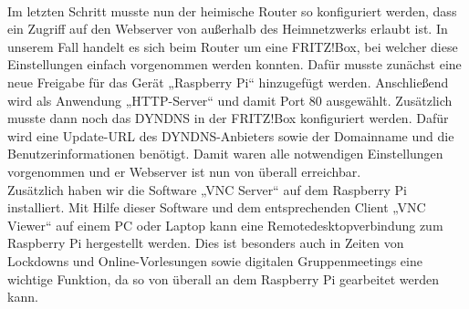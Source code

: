 \\
Im letzten Schritt musste nun der heimische Router so konfiguriert werden, dass ein Zugriff auf den Webserver von außerhalb des Heimnetzwerks erlaubt ist. In unserem Fall handelt es sich beim Router um eine FRITZ!Box, bei welcher diese Einstellungen einfach vorgenommen werden konnten.  Dafür musste zunächst eine neue Freigabe für das Gerät „Raspberry Pi“ hinzugefügt werden. Anschließend wird als Anwendung „HTTP-Server“ und damit Port 80 ausgewählt. Zusätzlich musste dann noch das DYNDNS in der FRITZ!Box konfiguriert werden. Dafür wird eine Update-URL des DYNDNS-Anbieters sowie der Domainname und die Benutzerinformationen benötigt. Damit waren alle notwendigen Einstellungen vorgenommen und er Webserver ist nun von überall erreichbar.
\\
Zusätzlich haben wir die Software „VNC Server“ auf dem Raspberry Pi installiert. Mit Hilfe dieser Software und dem entsprechenden Client „VNC Viewer“ auf einem PC oder Laptop kann eine Remotedesktopverbindung zum Raspberry Pi hergestellt werden. Dies ist besonders auch in Zeiten von Lockdowns und Online-Vorlesungen sowie digitalen Gruppenmeetings eine wichtige Funktion, da so von überall an dem Raspberry Pi gearbeitet werden kann.

